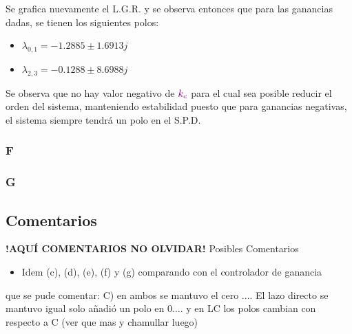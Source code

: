Se grafica nuevamente el L.G.R. y se observa entonces que para las ganancias dadas,
se tienen los siguientes polos:
    \begin{itemize}
        \item $\lambda_{0,1} = -1.2885 \pm 1.6913j$
        \item $\lambda_{2,3} = -0.1288 \pm 8.6988j$
    \end{itemize}

Se observa que no hay valor negativo de $\mathbin{\color{violet}k_{c}}$ para el cual sea posible
reducir el orden del sistema, manteniendo estabilidad puesto que para ganancias
negativas, el sistema siempre tendrá un polo en el S.P.D.

\FloatBarrier
\subsubsection{F}%

\FloatBarrier
\subsubsection{G}%

\FloatBarrier
\subsection{Comentarios}


\textbf{!AQUÍ COMENTARIOS NO OLVIDAR!}
Posibles Comentarios
\begin{itemize}
    \item Idem (c), (d), (e), (f) y (g) comparando con el controlador de ganancia
\end{itemize}


que se pude comentar:
 C) en ambos se mantuvo el cero .... El lazo directo se mantuvo igual solo añadió un polo en 0.... y en LC los polos cambian con respecto a C  (ver que mas y chamullar luego)
